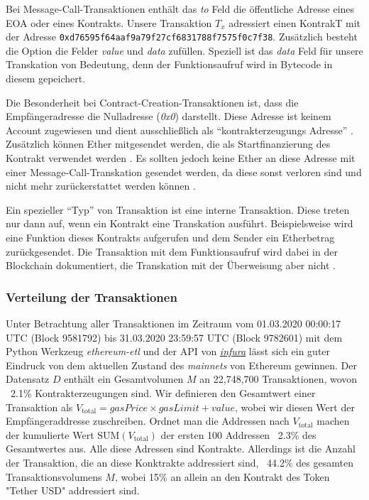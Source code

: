 \documentclass[runningheads]{llncs}
\begin{document}
Bei Message-Call-Transaktionen enthält das \textit{to} Feld die öffentliche Adresse eines EOA oder eines Kontrakts. Unsere Transaktion $T_x$ adressiert einen KontrakT mit der Adresse \verb+0xd76595f64aaf9a79f27cf6831788f7575f0c7f38+. Zusätzlich besteht die Option die Felder \textit{value} und \textit{data} zufüllen. Speziell ist das \textit{data} Feld für unsere Transkation von Bedeutung, denn der Funktionsaufruf wird in Bytecode in diesem gepeichert.

Die Besonderheit bei Contract-Creation-Transaktionen ist, dass die Empfängeradresse die Nulladresse (\textit{0x0}) darstellt. Diese Adresse ist keinem Account zugewiesen und dient ausschließlich als "`kontrakterzeugungs Adresse"' \cite{antonopoulos_mastering_2019}. Zusätzlich können Ether mitgesendet werden, die als Startfinanzierung des Kontrakt verwendet werden \cite[S. 4]{wood_ethereum/yellowpaper_2019}. Es sollten jedoch keine Ether an diese Adresse mit einer Message-Call-Transkation gesendet werden, da diese sonst verloren sind und nicht mehr zurückerstattet werden können \cite[S. 112]{antonopoulos_mastering_2019}.

Ein spezieller "`Typ"' von Transaktion ist eine interne Transaktion. Diese treten nur dann auf, wenn ein Kontrakt eine Transkation ausführt. Beispielsweise wird eine Funktion dieses Kontrakts aufgerufen und dem Sender ein Etherbetrag zurückgesendet. Die Transaktion mit dem Funktionsaufruf wird dabei in der Blockchain dokumentiert, die Transkation mit der Überweisung aber nicht \cite[S. 40]{antonopoulos_mastering_2019}.

\subsubsection{Verteilung der Transaktionen}
Unter Betrachtung aller Transaktionen im Zeitraum vom 01.03.2020 00:00:17 UTC (Block 9581792) bis 31.03.2020 23:59:57 UTC (Block 9782601) mit dem Python Werkzeug \textit{ethereum-etl} \cite{noauthor_blockchain-etl/ethereum-etl_2020} und der API von \href{https://infura.io/}{\textit{infura}} lässt sich ein guter Eindruck von dem aktuellen Zustand des \textit{mainnets} von Ethereum gewinnen. Der Datensatz $ D $ enthält ein Gesamtvolumen $ M $ an 22,748,700 Transaktionen, wovon ~2.1\% Kontrakterzeugungen sind. Wir definieren den Gesamtwert einer Transaktion als $ V_{\text{total}} = \textit{gasPrice} \times \textit{gasLimit} + \textit{value} $, wobei wir diesen Wert der Empfängeraddresse zuschreiben. Ordnet man die Addressen nach $ V_{\text{total}} $ machen der kumulierte Wert $ \text{SUM}(V_{\text{total}}) $ der ersten 100 Addressen ~2.3\% des Gesamtwertes aus. Alle diese Adressen sind Kontrakte. Allerdings ist die Anzahl der Transaktion, die an diese Konktrakte addressiert sind, ~44.2\% des gesamten Transaktionsvolumens $ M $, wobei 15\% an allein an den Kontrakt des Token "Tether USD" addressiert sind. \cite{neemann_appendix_nodate}
\end{document}
